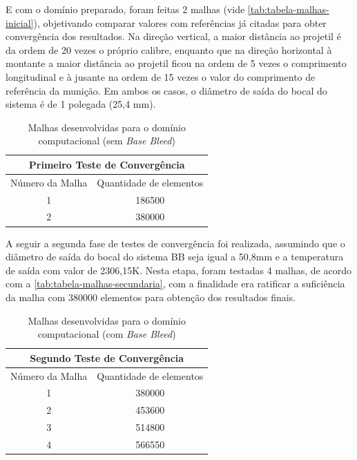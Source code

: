 E com o domínio preparado, foram feitas 2 malhas (vide \autoref{tab:tabela-malhas-inicial}), objetivando comparar valores com referências já citadas \cite{Mahmoud2009} para obter convergência dos resultados. Na direção vertical, a maior distância ao projetil é da ordem de 20 vezes o próprio calibre, enquanto que na direção horizontal à montante a maior distância ao projetil ficou na ordem de 5 vezes o comprimento longitudinal e à jusante na ordem de 15 vezes o valor do comprimento de referência da munição. Em ambos os casos, o diâmetro de saída do bocal do sistema  é de 1 polegada (25,4 mm).

\begin{table}[ht]
\centering
\caption[Malhas desenvolvidas para o domínio computacional (sem \textit{Base Bleed})]{Malhas desenvolvidas para o domínio computacional (sem \textit{Base Bleed})}
\vspace{0.5cm}
\begin{tabular}{c|c}
\multicolumn{2}{c}{Primeiro Teste de Convergência} \\
\hline 
Número da Malha & Quantidade de elementos \\ 
\hline
1 & 186500 \\
2 & 380000
\end{tabular}
\label{tab:tabela-malhas-inicial}
\end{table}

A seguir a segunda fase de testes de convergência foi realizada, assumindo que o diâmetro de saída do bocal do sistema BB seja igual a 50,8mm e a temperatura de saída com valor de 2306,15K. Nesta etapa, foram testadas 4 malhas, de acordo com a \autoref{tab:tabela-malhas-secundaria}, com a finalidade era ratificar a suficiência da malha com 380000 elementos para obtenção dos resultados finais.

\begin{table}[ht]
\centering
\caption[Malhas desenvolvidas para o domínio computacional (com )]{Malhas desenvolvidas para o domínio computacional (com \textit{Base Bleed})}
\vspace{0.5cm}
\begin{tabular}{c|c}
\multicolumn{2}{c}{Segundo Teste de Convergência} \\
\hline 
Número da Malha & Quantidade de elementos \\ 
\hline
1 & 380000 \\
2 & 453600 \\
3 & 514800 \\
4 & 566550
\end{tabular}
\label{tab:tabela-malhas-secundaria}
\end{table}

